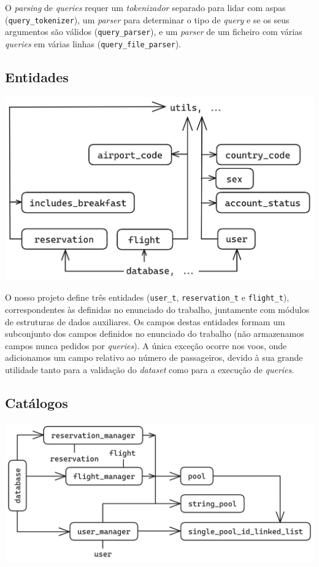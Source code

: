 \documentclass[12pt, a4paper]{article}
\begin{document}
O \emph{parsing} de \emph{queries} requer um \emph{tokenizador} separado para lidar com aspas
(\texttt{query\_tokenizer}), um \emph{parser} para determinar o tipo de \emph{query} e se os seus
argumentos são válidos (\texttt{query\_parser}), e um \emph{parser} de um ficheiro com várias
\emph{queries} em várias linhas (\texttt{query\_file\_parser}).

\subsection{Entidades}

\begin{center}
	\includegraphics[scale=0.2]{res/entities.png}
\end{center}

O nosso projeto define três entidades (\texttt{user\_t}, \texttt{reservation\_t} e
\texttt{flight\_t}), correspondentes às definidas no enunciado do trabalho, juntamente com módulos
de estruturas de dados auxiliares. Os campos destas entidades formam um subconjunto dos campos
definidos no enunciado do trabalho (não armazenamos campos nunca pedidos por \emph{queries}). A
única exceção ocorre nos voos, onde adicionamos um campo relativo ao número de passageiros, devido
à sua grande utilidade tanto para a validação do \emph{dataset} como para a execução de
\emph{queries}.

\subsection{Catálogos}

\begin{center}
	\includegraphics[scale=0.19]{res/database.png}
\end{center}
\end{document}
